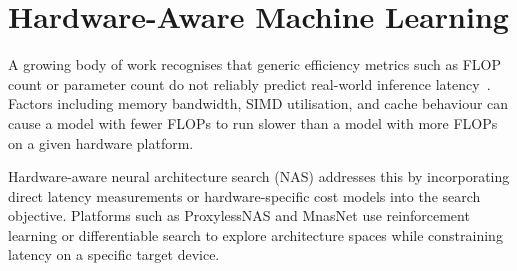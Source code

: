 \section{Hardware-Aware Machine Learning}

A growing body of work recognises that generic efficiency metrics such
as FLOP count or parameter count do not reliably predict real-world
inference latency~\cite{devlin2019bert}. Factors including memory
bandwidth, SIMD utilisation, and cache behaviour can cause a model with
fewer FLOPs to run slower than a model with more FLOPs on a given
hardware platform.

Hardware-aware neural architecture search (NAS) addresses this by
incorporating direct latency measurements or hardware-specific cost
models into the search objective. Platforms such as ProxylessNAS and
MnasNet use reinforcement learning or differentiable search to explore
architecture spaces while constraining latency on a specific target
device.
